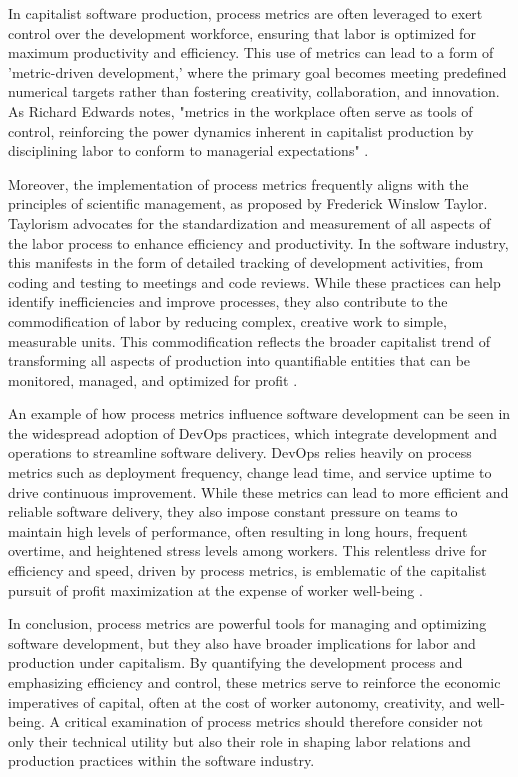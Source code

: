 \begin{refsection}
In capitalist software production, process metrics are often leveraged to exert control over the development workforce, ensuring that labor is optimized for maximum productivity and efficiency. This use of metrics can lead to a form of 'metric-driven development,' where the primary goal becomes meeting predefined numerical targets rather than fostering creativity, collaboration, and innovation. As Richard Edwards notes, "metrics in the workplace often serve as tools of control, reinforcing the power dynamics inherent in capitalist production by disciplining labor to conform to managerial expectations" \cite[pp.~112-115]{Edwards1980ContestedTerrain}.

Moreover, the implementation of process metrics frequently aligns with the principles of scientific management, as proposed by Frederick Winslow Taylor. Taylorism advocates for the standardization and measurement of all aspects of the labor process to enhance efficiency and productivity. In the software industry, this manifests in the form of detailed tracking of development activities, from coding and testing to meetings and code reviews. While these practices can help identify inefficiencies and improve processes, they also contribute to the commodification of labor by reducing complex, creative work to simple, measurable units. This commodification reflects the broader capitalist trend of transforming all aspects of production into quantifiable entities that can be monitored, managed, and optimized for profit \cite[pp.~55-57]{Taylor2009ScientificManagement}.

An example of how process metrics influence software development can be seen in the widespread adoption of DevOps practices, which integrate development and operations to streamline software delivery. DevOps relies heavily on process metrics such as deployment frequency, change lead time, and service uptime to drive continuous improvement. While these metrics can lead to more efficient and reliable software delivery, they also impose constant pressure on teams to maintain high levels of performance, often resulting in long hours, frequent overtime, and heightened stress levels among workers. This relentless drive for efficiency and speed, driven by process metrics, is emblematic of the capitalist pursuit of profit maximization at the expense of worker well-being \cite[pp.~78-81]{Kim2013DevOpsHandbook}.

In conclusion, process metrics are powerful tools for managing and optimizing software development, but they also have broader implications for labor and production under capitalism. By quantifying the development process and emphasizing efficiency and control, these metrics serve to reinforce the economic imperatives of capital, often at the cost of worker autonomy, creativity, and well-being. A critical examination of process metrics should therefore consider not only their technical utility but also their role in shaping labor relations and production practices within the software industry.


\end{refsection}
